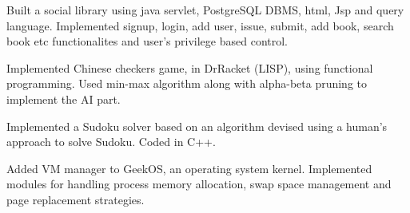 



\begin{cventries}

  \cvproject
    {
      \begin{cvitems} %
         \item{ Built a social library using java servlet, PostgreSQL DBMS, html, Jsp and query language. Implemented signup, login, add user, issue, submit, add book, search book etc  functionalites and  user’s privilege based control.}
\item{ Implemented Chinese checkers game, in DrRacket (LISP), using functional programming. Used min-max algorithm along with alpha-beta pruning to implement the AI part.}
\item{Implemented a Sudoku solver based on an algorithm devised using a human’s approach to solve Sudoku. Coded in C++.}
\item{ Added VM manager to GeekOS, an operating system kernel. Implemented modules for handling process memory allocation, swap space management and page replacement strategies. }
      \end{cvitems}
    }

\end{cventries}